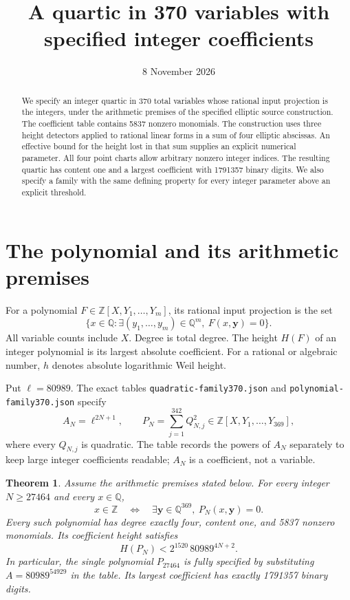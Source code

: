 \documentclass[11pt,a4paper]{article}
\title{A quartic in 370 variables with specified integer coefficients}
\author{}\date{8 November 2026}
\newtheorem{theorem}{Theorem}[section]
\theoremstyle{remark}\newtheorem{remark}[theorem]{Remark}
\newcommand{\Q}{\mathbb Q}\newcommand{\Z}{\mathbb Z}
\begin{document}
\maketitle
\begin{abstract}
We specify an integer quartic in 370 total variables whose rational
input projection is the integers, under the arithmetic premises of
the specified elliptic source construction. The coefficient table
contains 5837 nonzero monomials. The construction uses three height
detectors applied to rational linear forms in a sum of four
elliptic abscissas. An effective bound for the height lost in that
sum supplies an explicit numerical parameter. All four point charts
allow arbitrary nonzero integer indices. The resulting quartic has
content one and a largest coefficient with 1791357 binary digits.
We also specify a family with the same defining property for every
integer parameter above an explicit threshold.
\end{abstract}

\section{The polynomial and its arithmetic premises}

For a polynomial $F\in\Z[X,Y_1,\ldots,Y_m]$, its rational input
projection is the set
\[
 \{x\in\Q:\exists (y_1,\ldots,y_m)\in\Q^m,\ F(x,\boldsymbol y)=0\}.
\]
All variable counts include $X$. Degree is total degree. The height
$H(F)$ of an integer polynomial is its largest absolute coefficient.
For a rational or algebraic number, $h$ denotes absolute logarithmic
Weil height.

Put $\ell=80989$. The exact tables
\nolinkurl{quadratic-family370.json} and
\nolinkurl{polynomial-family370.json} specify
\[
 A_N=\ell^{2N+1},\qquad
 P_N=\sum_{j=1}^{342}Q_{N,j}^2
       \in\Z[X,Y_1,\ldots,Y_{369}],
\]
where every $Q_{N,j}$ is quadratic. The table records the powers
of $A_N$ separately to keep large integer coefficients readable;
$A_N$ is a coefficient, not a variable.

\begin{theorem}\label{thm:main}
Assume the arithmetic premises stated below. For every integer
$N\ge27464$ and every $x\in\Q$,
\[
 x\in\Z\quad\Longleftrightarrow\quad
 \exists\boldsymbol y\in\Q^{369},\ P_N(x,\boldsymbol y)=0.
\]
Every such polynomial has degree exactly four, content one,
and 5837 nonzero monomials. Its coefficient height satisfies
\[
                   H(P_N)<2^{1520}\,80989^{4N+2}.
\]
In particular, the single polynomial $P_{27464}$ is fully specified
by substituting $A=80989^{54929}$ in the table. Its largest
coefficient has exactly 1791357 binary digits.
\end{theorem}
\end{document}
